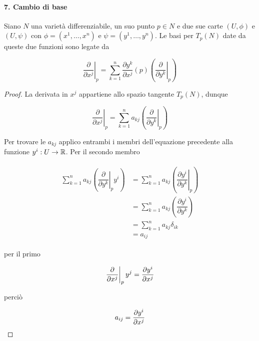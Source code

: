 \paragraph{7. Cambio di base}

Siano $ N $ una varietà differenziabile, un suo punto $ p \in N $ e due sue carte $ (U,\phi) $ e $ (U,\psi) $ con $ \phi = (x^{1},\dots,x^{n}) $ e $ \psi = (y^{1},\dots,y^{n}) $. Le basi per $ T_{p}(N) $ date da queste due funzioni sono legate da

\begin{equation}
	\left. \dfrac{\partial}{\partial x^{j}} \right|_{p} = \sum_{k=1}^{n} \dfrac{\partial y^{k}}{\partial x^{j}} (p) \left( \left. \dfrac{\partial}{\partial y^{k}} \right|_{p} \right)
\end{equation}

\begin{proof}
	La derivata in $ x^{j} $ appartiene allo spazio tangente $ T_{p}(N) $, dunque
	
	\begin{equation}
		\left. \dfrac{\partial}{\partial x^{j}} \right|_{p} = \sum_{k=1}^{n} a_{kj} \left( \left. \dfrac{\partial}{\partial y^{k}} \right|_{p} \right)
	\end{equation}

	Per trovare le $ a_{kj} $ applico entrambi i membri dell'equazione precedente alla funzione $ y^{i} : U \to \mathbb{R} $. Per il secondo membro
	
	\begin{align}
		\begin{split}
			\sum_{k=1}^{n} a_{kj} \left( \left. \dfrac{\partial}{\partial y^{k}} \right|_{p} y^{i} \right) &= \sum_{k=1}^{n} a_{kj} \left( \left. \dfrac{\partial y^{i}}{\partial y^{k}} \right|_{p} \right)\\
			&= \sum_{k=1}^{n} a_{kj} \left( \dfrac{\partial y^{i}}{\partial y^{k}}\right)\\
			&= \sum_{k=1}^{n} a_{kj} \delta_{ik}\\
			&= a_{ij}
		\end{split}
	\end{align}

	per il primo
	
	\begin{equation}
		\eval{ \pdv{x^{j}} }_{p} y^{j} = \pdv{y^{i}}{x^{j}} (p)
	\end{equation}

	perciò
	
	\begin{equation}
		a_{ij} = \pdv{y^{i}}{x^{j}} (p)
	\end{equation}
\end{proof}

